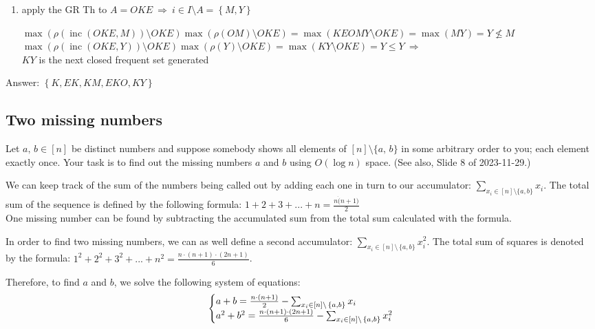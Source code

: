 \documentclass{article}
\newcommand{\inc}{\operatorname{inc}}
\begin{document}
\begin{enumerate}
    \item apply the GR Th to $A = OKE ~\Longrightarrow~  i \in I \setminus A = \left\{ {M, Y} \right\}$
    \begin{center}
      $\max(\rho(\inc(OKE, M)) \setminus OKE) \max(\rho(OM)\setminus OKE) =\max(KEOMY\setminus OKE) = \max(MY) = Y \nleqslant M$
      $\max(\rho(\inc(OKE, Y))\setminus OKE) \max(\rho(Y)\setminus OKE) = \max(KY\setminus OKE) = Y \leqslant Y ~\Longrightarrow~$ \\
      $KY$ is the next closed frequent set generated \\
    \end{center}

  \end{enumerate}
  Answer: $\left\{ {K, EK, KM, EKO, KY} \right\}$

  \subsection{Two missing numbers}
  \begin{centerframebox}
    Let $a,\, b \in [n]$ be distinct numbers and suppose somebody
    shows all elements of $[n] \setminus \{a,\, b\}$ in some arbitrary order to you;
    each element exactly once.
    Your task is to find out the missing numbers $a$ and $b$ using $O(\log n)$ space.
    (See also, Slide 8 of 2023-11-29.)
  \end{centerframebox}
  We can keep track of the sum of the numbers being called out by adding each one in turn to our accumulator:
  $\sum_{x_i \in [n] \setminus \{a, b\}}x_i$.
  The total sum of the sequence is defined by the following formula: $1 + 2 + 3 + ... + n = \frac{n \dot (n+1)}{2}$ \\
  One missing number can be found by subtracting the accumulated sum from the total sum calculated with the formula.

  In order to find two missing numbers, we can as well define a second accumulator: $\sum_{x_i \in [n] \setminus{\,} \{a, b\}}x_i^2$. The total sum of squares is denoted by the formula:
  $1^2 + 2^2 + 3^2 + ... + n^2 = \frac{n \cdot (n+1) \cdot (2n+1)}{6}$.

  Therefore, to find $a$ and $b$, we solve the following system of equations:
  \begin{equation*}
    \left\{\begin{array}{@{}l@{}}
      a+b=\frac{n \cdot (n+1)}{2} - \sum_{x_i \in [n] \setminus{\,} \{a, b\}}x_i \\
      a^2 + b^2 = \frac{n \cdot (n+1) \cdot (2n+1)}{6} - \sum_{x_i \in [n] \setminus{\,} \{a, b\}}x_i^2
    \end{array}\right.
  \end{equation*}
\end{document}
